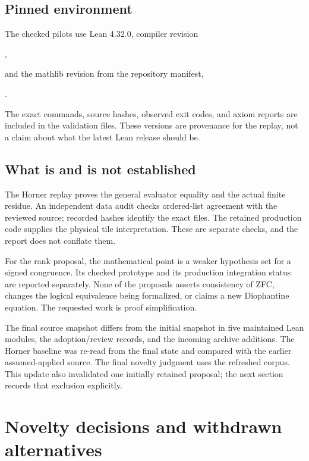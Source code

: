 \documentclass[11pt,a4paper]{article}
\begin{document}
\subsection{Pinned environment}

The checked pilots use Lean 4.32.0, compiler revision
\begin{center}
\small{},
\end{center}
and the mathlib revision from the repository manifest,
\begin{center}
\small{}.
\end{center}
The exact commands, source hashes, observed exit codes, and axiom reports are included in the validation files. These versions are provenance for the replay, not a claim about what the latest Lean release should be.\cite{toolchain,manifest}



\subsection{What is and is not established}

The Horner replay proves the general evaluator equality and the actual finite residue. An independent data audit checks ordered-list agreement with the reviewed source; recorded hashes identify the exact files. The retained production code supplies the physical tile interpretation. These are separate checks, and the report does not conflate them.

For the rank proposal, the mathematical point is a weaker hypothesis set for a signed congruence. Its checked prototype and its production integration status are reported separately. None of the proposals asserts consistency of ZFC, changes the logical equivalence being formalized, or claims a new Diophantine equation. The requested work is proof simplification.

The final source snapshot differs from the initial snapshot in five maintained Lean modules, the adoption/review records, and the incoming archive additions. The Horner baseline was re-read from the final state and compared with the earlier assumed-applied source. The final novelty judgment uses the refreshed corpus. This update also invalidated one initially retained proposal; the next section records that exclusion explicitly.

\section{Novelty decisions and withdrawn alternatives}
\end{document}
